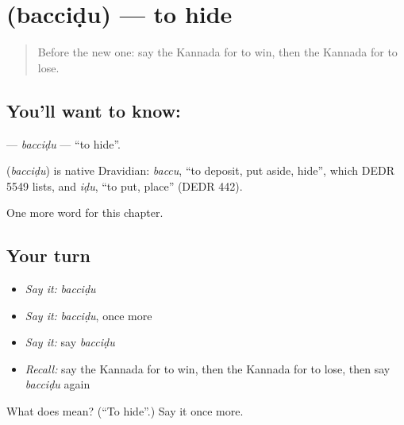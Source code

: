 \section[\texorpdfstring{\kn{ಬಚ್ಚಿಡು} (bacciḍu)}{ಬಚ್ಚಿಡು (bacciḍu)}]{ (bacciḍu) — to hide}

\label{lesson:KA-C151-baccidu}



\begin{quote}
Before the new one: say the Kannada for to win, then the Kannada for to lose.
\end{quote}

\subsection*{You'll want to know: }
\textbf{} — \emph{bacciḍu} — \textquotedblleft{}to hide\textquotedblright{}.

\begin{cousinweb}
\textbf{} (\emph{bacciḍu}) is native Dravidian: \emph{baccu}, \textquotedblleft{}to deposit, put aside, hide\textquotedblright{}, which DEDR 5549 lists, and \emph{iḍu}, \textquotedblleft{}to put, place\textquotedblright{} (DEDR 442).
\end{cousinweb}

\begin{grammarlens}[title={What you've built}]
One more word for this chapter.
\end{grammarlens}

\subsection*{Your turn}
\begin{itemize}
\raggedright
  \item \emph{Say it:} \emph{bacciḍu}
  \item \emph{Say it:} \emph{bacciḍu}, once more
  \item \emph{Say it:} say \emph{bacciḍu}
  \item \emph{Recall:} say the Kannada for to win, then the Kannada for to lose, then say \emph{bacciḍu} again
\end{itemize}

\begin{tcolorbox}[breakable,colback=teal!4,colframe=teal!35!black,title={Before you move on}]
What does  mean? (\textquotedblleft{}To hide\textquotedblright{}.) Say it once more.
\end{tcolorbox}
